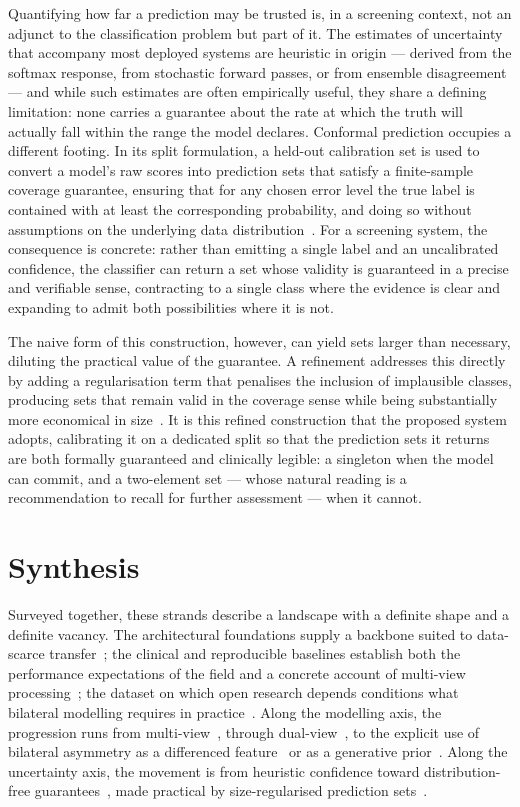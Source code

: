 \documentclass[12pt, a4paper]{article}
\begin{document}
Quantifying how far a prediction may be trusted is, in a screening context,
not an adjunct to the classification problem but part of it. The estimates
of uncertainty that accompany most deployed systems are heuristic in origin
--- derived from the softmax response, from stochastic forward passes, or
from ensemble disagreement --- and while such estimates are often
empirically useful, they share a defining limitation: none carries a
guarantee about the rate at which the truth will actually fall within the
range the model declares. Conformal prediction occupies a different footing.
In its split formulation, a held-out calibration set is used to convert a
model's raw scores into prediction sets that satisfy a finite-sample
coverage guarantee, ensuring that for any chosen error level the true label
is contained with at least the corresponding probability, and doing so
without assumptions on the underlying data distribution~\cite{Angelopoulos2021}.
For a screening system, the consequence is concrete: rather than emitting a
single label and an uncalibrated confidence, the classifier can return a set
whose validity is guaranteed in a precise and verifiable sense, contracting
to a single class where the evidence is clear and expanding to admit both
possibilities where it is not.

The naive form of this construction, however, can yield sets larger than
necessary, diluting the practical value of the guarantee. A refinement
addresses this directly by adding a regularisation term that penalises the
inclusion of implausible classes, producing sets that remain valid in the
coverage sense while being substantially more economical in
size~\cite{Romano2020}. It is this refined construction that the proposed
system adopts, calibrating it on a dedicated split so that the prediction
sets it returns are both formally guaranteed and clinically legible: a
singleton when the model can commit, and a two-element set --- whose natural
reading is a recommendation to recall for further assessment --- when it
cannot.

\section{Synthesis}

Surveyed together, these strands describe a landscape with a definite shape
and a definite vacancy. The architectural foundations supply a backbone
suited to data-scarce transfer~\cite{Huang2017}; the clinical and
reproducible baselines establish both the performance expectations of the
field and a concrete account of multi-view processing~\cite{McKinney2020,
Wu2019}; the dataset on which open research depends conditions what
bilateral modelling requires in practice~\cite{Lee2017}. Along the modelling
axis, the progression runs from multi-view~\cite{Wu2019}, through
dual-view~\cite{Wu2020}, to the explicit use of bilateral asymmetry as a
differenced feature~\cite{Nguyen2019} or as a generative
prior~\cite{Yang2021}. Along the uncertainty axis, the movement is from
heuristic confidence toward distribution-free guarantees~\cite{Angelopoulos2021},
made practical by size-regularised prediction sets~\cite{Romano2020}.
\end{document}
